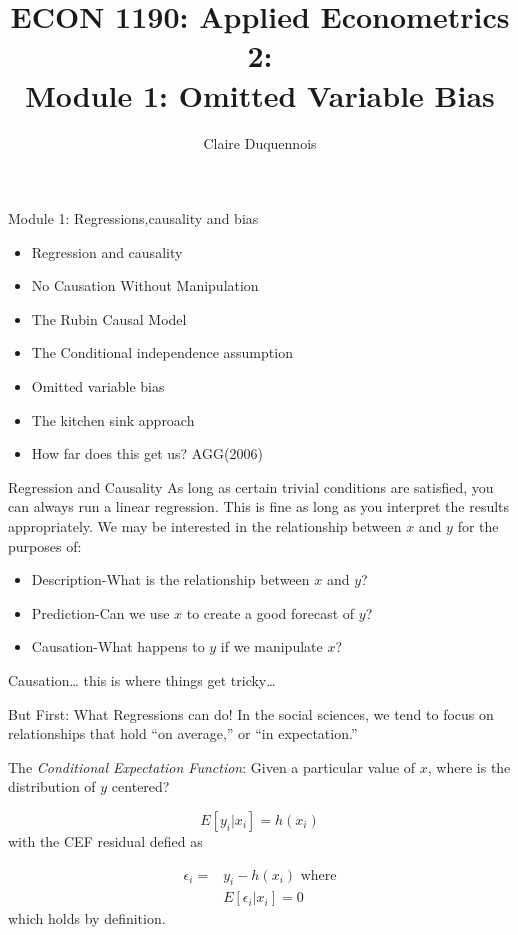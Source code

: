 \documentclass[
  ignorenonframetext,
]{beamer}
\title{ECON 1190: Applied Econometrics 2:\\
Module 1: Omitted Variable Bias}
\author{Claire Duquennois}
\date{}
\begin{document}
\frame{\titlepage}

\begin{frame}{Module 1: Regressions,causality and bias}
\protect\hypertarget{module-1-regressionscausality-and-bias}{}
\begin{itemize}
\item
  Regression and causality
\item
  No Causation Without Manipulation
\item
  The Rubin Causal Model
\item
  The Conditional independence assumption
\item
  Omitted variable bias
\item
  The kitchen sink approach
\item
  How far does this get us? AGG(2006)
\end{itemize}
\end{frame}

\begin{frame}{Regression and Causality}
\protect\hypertarget{regression-and-causality}{}
As long as certain trivial conditions are satisfied, you can always run
a linear regression. This is fine as long as you interpret the results
appropriately. We may be interested in the relationship between \(x\)
and \(y\) for the purposes of:

\begin{itemize}
\item
  Description-What is the relationship between \(x\) and \(y\)?
\item
  Prediction-Can we use \(x\) to create a good forecast of \(y\)?
\item
  Causation-What happens to \(y\) if we manipulate \(x\)?
\end{itemize}

Causation\ldots{} this is where things get tricky\ldots{}
\end{frame}

\begin{frame}{But First: What Regressions can do!}
\protect\hypertarget{but-first-what-regressions-can-do}{}
In the social sciences, we tend to focus on relationships that hold ``on
average,'' or ``in expectation.''

The \emph{Conditional Expectation Function}: Given a particular value of
\(x\), where is the distribution of \(y\) centered?

\[
E[y_i|x_i]=h(x_i)
\] with the CEF residual defied as

\[
\begin{aligned}
\epsilon_i = &y_i-h(x_i) \text{ where}\\ 
& E[\epsilon_i|x_i]=0
\end{aligned}
\] which holds by definition.
\end{frame}
\end{document}
